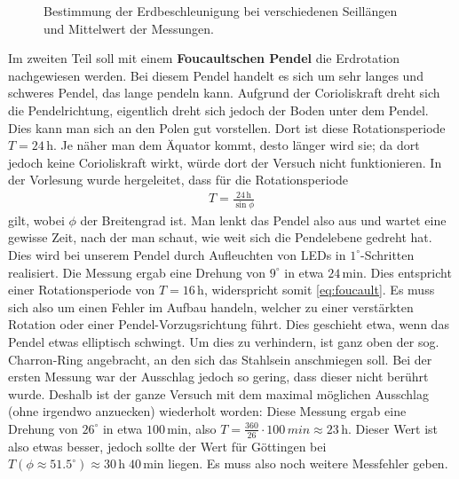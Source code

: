 \documentclass[12pt,a4paper,headinclude,bibtotoc]{scrartcl}
\begin{document}
\begin{figure}[!htb]
	\centering
	
	\caption{Bestimmung der Erdbeschleunigung bei verschiedenen Seillängen und Mittelwert der Messungen.}
	\label{fig:gbesch}
\end{figure}

Im zweiten Teil soll mit einem \textbf{Foucaultschen Pendel} die Erdrotation nachgewiesen werden.
Bei diesem Pendel handelt es sich um sehr langes und schweres Pendel, das lange pendeln kann.
Aufgrund der Corioliskraft dreht sich die Pendelrichtung, eigentlich dreht sich jedoch der Boden unter dem Pendel.
Dies kann man sich an den Polen gut vorstellen.
Dort ist diese Rotationsperiode $T=24\,$h.
Je näher man dem Äquator kommt, desto länger wird sie; da dort jedoch keine Corioliskraft wirkt, würde dort der Versuch nicht funktionieren.
In der Vorlesung wurde hergeleitet, dass für die Rotationsperiode 
\begin{align}
	T=\frac{24\,\si{\hour}}{\sin\phi}
	\label{eq:foucault}
\end{align}
gilt, wobei $\phi$ der Breitengrad ist.
Man lenkt das Pendel also aus und wartet eine gewisse Zeit, nach der man schaut, wie weit sich die Pendelebene gedreht hat.
Dies wird bei unserem Pendel durch Aufleuchten von LEDs in $1^\circ$-Schritten realisiert.
Die Messung ergab eine Drehung von $9^\circ$ in etwa $24\,$min.
Dies entspricht einer Rotationsperiode von $T=16\,$h, widerspricht somit \eqref{eq:foucault}.
Es muss sich also um einen Fehler im Aufbau handeln, welcher zu einer verstärkten Rotation oder einer Pendel-Vorzugsrichtung führt.
Dies geschieht etwa, wenn das Pendel etwas elliptisch schwingt.
Um dies zu verhindern, ist ganz oben der sog. Charron-Ring angebracht, an den sich das Stahlsein anschmiegen soll.
Bei der ersten Messung war der Ausschlag jedoch so gering, dass dieser nicht berührt wurde.
Deshalb ist der ganze Versuch mit dem maximal möglichen Ausschlag (ohne irgendwo anzuecken) wiederholt worden:
Diese Messung ergab eine Drehung von $26^\circ$ in etwa $100\,$min, also $T=\frac{360}{26}\cdot 100\,\si{min}\approx23\,$h.
Dieser Wert ist also etwas besser, jedoch sollte der Wert für Göttingen bei $T(\phi\approx 51.5^\circ)\approx30\,\si{\hour} \;40\,\si{\minute}$ liegen.
Es muss also noch weitere Messfehler geben.
\end{document}

